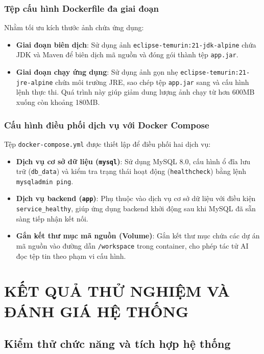 \documentclass[12pt,a4paper]{report}
\begin{document}
\subsection{Tệp cấu hình Dockerfile đa giai đoạn}
Nhằm tối ưu kích thước ảnh chứa ứng dụng:
\begin{itemize}
    \item \textbf{Giai đoạn biên dịch}: Sử dụng ảnh \texttt{eclipse-temurin:21-jdk-alpine} chứa JDK và Maven để biên dịch mã nguồn và đóng gói thành tệp \texttt{app.jar}.
    \item \textbf{Giai đoạn chạy ứng dụng}: Sử dụng ảnh gọn nhẹ \texttt{eclipse-temurin:21-jre-alpine} chứa môi trường JRE, sao chép tệp \texttt{app.jar} sang và cấu hình lệnh thực thi. Quá trình này giúp giảm dung lượng ảnh chạy từ hơn 600MB xuống còn khoảng 180MB.
\end{itemize}

\subsection{Cấu hình điều phối dịch vụ với Docker Compose}
Tệp \texttt{docker-compose.yml} được thiết lập để điều phối hai dịch vụ:
\begin{itemize}
    \item \textbf{Dịch vụ cơ sở dữ liệu (\texttt{mysql})}: Sử dụng MySQL 8.0, cấu hình ổ đĩa lưu trữ (\texttt{db\_data}) và kiểm tra trạng thái hoạt động (\texttt{healthcheck}) bằng lệnh \texttt{mysqladmin ping}.
    \item \textbf{Dịch vụ backend (\texttt{app})}: Phụ thuộc vào dịch vụ cơ sở dữ liệu với điều kiện \texttt{service\_healthy}, giúp ứng dụng backend khởi động sau khi MySQL đã sẵn sàng tiếp nhận kết nối.
    \item \textbf{Gắn kết thư mục mã nguồn (Volume)}: Gắn kết thư mục chứa các dự án mã nguồn vào đường dẫn \texttt{/workspace} trong container, cho phép tác tử AI đọc tệp tin theo phạm vi cấu hình.
\end{itemize}

\chapter{KẾT QUẢ THỬ NGHIỆM VÀ ĐÁNH GIÁ HỆ THỐNG}

\section{Kiểm thử chức năng và tích hợp hệ thống}
\end{document}
